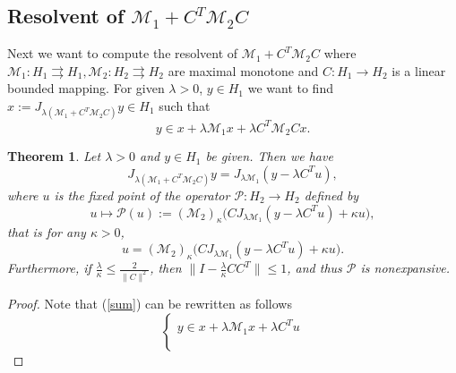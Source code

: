 \documentclass[11pt]{article}
\def\beq{\begin{equation}}
\def\eeq{\end{equation}}
\theoremstyle{plain}
\newtheorem{theorem}{Theorem}
\begin{document}
{\subsection{Resolvent of $\mathcal{M}_1+C^T\mathcal{M}_2C$}
Next we want to compute the resolvent of $\mathcal{M}_1+C^T\mathcal{M}_2C$ where $\mathcal{M}_1: H_1 \rightrightarrows H_1, \mathcal{M}_2: H_2 \rightrightarrows H_2$ are maximal monotone and $C: H_1\to H_2$ is a linear bounded mapping. For given $\lambda>0$, $y\in H_1$ we want to find $x:=J_{\lambda (\mathcal{M}_1 + C^T \mathcal{M}_2 C)} y\in H_1$ such that 
\beq\label{sum}
y\in x+\lambda\mathcal{M}_1x+\lambda C^T\mathcal{M}_2Cx.
\eeq 

{
\begin{theorem}\label{tmf2}
Let $\lambda > 0$ and $y \in H_1$ be given. Then we have
$$J_{\lambda (\mathcal{M}_1 + C^T \mathcal{M}_2 C)} y=J_{\lambda \mathcal{M}_1}(y - \lambda C^T u),$$
where $u$ is the fixed point of the operator $\mathcal{P}: H_2 \to H_2$ defined by
$$u\mapsto \mathcal{P}(u) := (\mathcal{M}_2)_\kappa \Big(C J_{\lambda \mathcal{M}_1}(y - \lambda C^T u) + \kappa u\Big),$$
 that is for any $\kappa > 0$,
\begin{equation}\label{fixp2}
u = (\mathcal{M}_2)_\kappa \Big(C J_{\lambda \mathcal{M}_1}(y - \lambda C^T u) + \kappa u\Big).
\end{equation}
Furthermore, if $\frac{\lambda}{\kappa} \leq \frac{2}{\|C\|^2}$, then $\|I - \frac{\lambda}{\kappa} CC^T \| \leq 1$, and thus $\mathcal{P}$ is {nonexpansive}.
\end{theorem}
}
\begin{proof}
Note that (\ref{sum}) can be rewritten as follows  
\begin{equation}
\left\{
\begin{array}{l}
y\in  x+\lambda\mathcal{M}_1x+\lambda C^Tu\\ \\

\end{array}
\end{equation}
\end{proof}}
\end{document}
